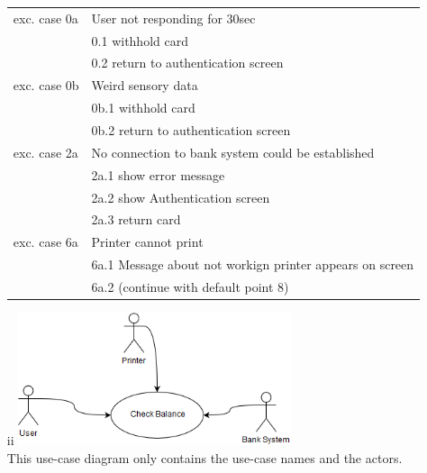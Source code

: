 \documentclass{scrartcl}
\begin{document}
\begin{itemize}
\begin{tabular}{|l|l|}
            exc. case 0a    & User not responding for 30sec \\
                            & 0.1 withhold card \\
                            & 0.2 return to authentication screen \\ \hline
            exc. case 0b    & Weird sensory data \\
                            & 0b.1 withhold card \\
                            & 0b.2 return to authentication screen \\ \hline
            exc. case 2a    & No connection to bank system could be established \\
                            & 2a.1 show error message \\
                            & 2a.2 show Authentication screen \\
                            & 2a.3 return card \\ \hline
            exc. case 6a    & Printer cannot print \\
                            & 6a.1 Message about not workign printer appears on screen \\
                            & 6a.2 (continue with default point 8) \\ \hline

        \end{tabular}
    \item[ii]
    	\includegraphics[width=8cm]{use_case_diagram.png} \\
        This use-case diagram only contains the use-case names and the actors.
\end{itemize}
\end{document}
